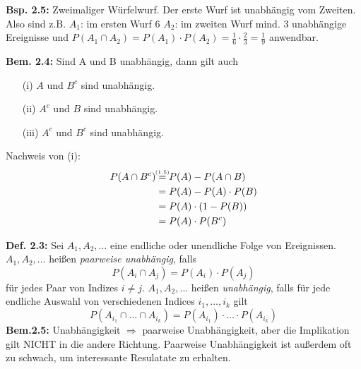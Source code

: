 \documentclass[a4paper,11pt]{article}
\newcommand\eqonefive{\overset{\mathclap{\scriptscriptstyle (1.5)}}{=}}
\begin{document}
\vspace{6pt}
\noindent\textbf{Bsp. 2.5:} Zweimaliger Würfelwurf. Der erste Wurf ist unabhängig vom Zweiten. 
\newline Also sind z.B.
\newline $A_1$: \glqq im ersten Wurf 6\grqq
\newline $A_2$: \glqq im zweiten Wurf mind. 3\grqq
\newline unabhängige Ereignisse und $P(A_1\cap A_2)=P(A_1)\cdot P(A_2)=\frac{1}{6}\cdot\frac{2}{3}=\frac{1}{9}$ anwendbar.

\vspace{6pt}
\noindent\textbf{Bem. 2.4:} Sind A und B unabhängig, dann gilt auch
\begin{itemize}
    \item[(i)] $A$ und $B^c$ sind unabhängig.
    \item[(ii)] $A^c$ und $B$ sind unabhängig.
    \item[(iii)] $A^c$ und $B^c$ sind unabhängig.
\end{itemize}

\noindent Nachweis von (i):
\begin{align*}
P(A\cap B^c) &\eqonefive P(A)-P(A\cap B)\\
&= P(A) - P(A)\cdot P(B)\\
&= P(A)\cdot(1-P(B))\\
&= P(A)\cdot P(B^c)
\end{align*}

\vspace{6pt}
\noindent\textbf{Def. 2.3:} Sei $A_1,A_2,\dots$ eine endliche oder unendliche Folge von Ereignissen.
$A_1,A_2,\dots$ heißen \textit{paarweise unabhängig}, falls
\[P(A_i\cap A_j)=P(A_i)\cdot P(A_j)\]
für jedes Paar von Indizes $i\neq j$.
\newline $A_1,A_2,\dots$ heißen \textit{unabhängig}, falls für jede endliche Auswahl von verschiedenen Indices $i_1,\dots,i_k$ gilt 
\[P(A_{i_1}\cap\dots\cap A_{i_k})=P(A_{i_1})\cdot\dots\cdot P(A_{i_k})\]
\newline \textbf{Bem.2.5:} Unabhängigkeit $\Rightarrow$ paarweise Unabhängigkeit, aber die Implikation gilt NICHT in die andere Richtung. 
Paarweise Unabhängigkeit ist außerdem oft zu schwach, um interessante Resulatate zu erhalten.
\end{document}
